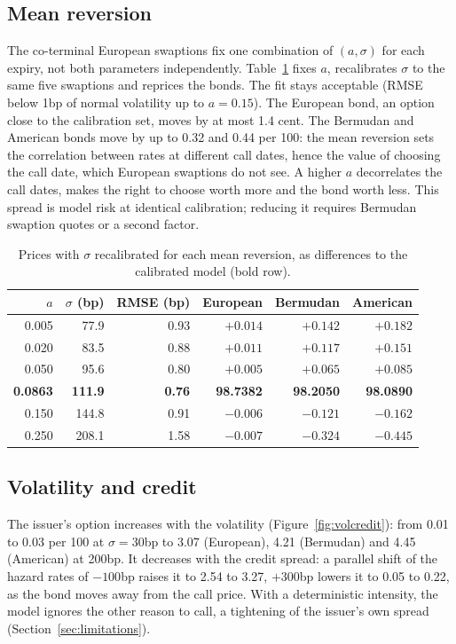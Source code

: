 \documentclass[11pt,a4paper]{article}
\begin{document}
\subsection{Mean reversion}
The co-terminal European swaptions fix one combination of $(a, \sigma)$ for each expiry, not both parameters
independently. Table~\ref{tab:meanrev} fixes $a$, recalibrates $\sigma$ to the same five swaptions and reprices the
bonds. The fit stays acceptable (RMSE below 1bp of normal volatility up to $a = 0.15$). The European bond, an option
close to the calibration set, moves by at most 1.4 cent. The Bermudan and American bonds move by up to 0.32 and 0.44
per 100: the mean reversion sets the correlation between rates at different call dates, hence the value of choosing
the call date, which European swaptions do not see. A higher $a$ decorrelates the call dates, makes the right to
choose worth more and the bond worth less. This spread is model risk at identical calibration; reducing it requires
Bermudan swaption quotes or a second factor.

\begin{table}[h]
\centering
\begin{tabular}{@{}rrrrrr@{}}
\toprule
$a$ & $\sigma$ (bp) & \textbf{RMSE (bp)} & \textbf{European} & \textbf{Bermudan} & \textbf{American} \\
\midrule
0.005 & 77.9 & 0.93 & $+0.014$ & $+0.142$ & $+0.182$ \\
0.020 & 83.5 & 0.88 & $+0.011$ & $+0.117$ & $+0.151$ \\
0.050 & 95.6 & 0.80 & $+0.005$ & $+0.065$ & $+0.085$ \\
\textbf{0.0863} & \textbf{111.9} & \textbf{0.76} & \textbf{98.7382} & \textbf{98.2050} & \textbf{98.0890} \\
0.150 & 144.8 & 0.91 & $-0.006$ & $-0.121$ & $-0.162$ \\
0.250 & 208.1 & 1.58 & $-0.007$ & $-0.324$ & $-0.445$ \\
\bottomrule
\end{tabular}
\caption{Prices with $\sigma$ recalibrated for each mean reversion, as differences to the calibrated model (bold row).}
\label{tab:meanrev}
\end{table}

\subsection{Volatility and credit}
The issuer's option increases with the volatility (Figure~\ref{fig:volcredit}): from 0.01 to 0.03 per 100 at
$\sigma = 30$bp to 3.07 (European), 4.21 (Bermudan) and 4.45 (American) at 200bp. It decreases with the credit
spread: a parallel shift of the hazard rates of $-100$bp raises it to 2.54 to 3.27, $+300$bp lowers it to 0.05 to
0.22, as the bond moves away from the call price. With a deterministic intensity, the model ignores the other reason
to call, a tightening of the issuer's own spread (Section~\ref{sec:limitations}).
\end{document}
